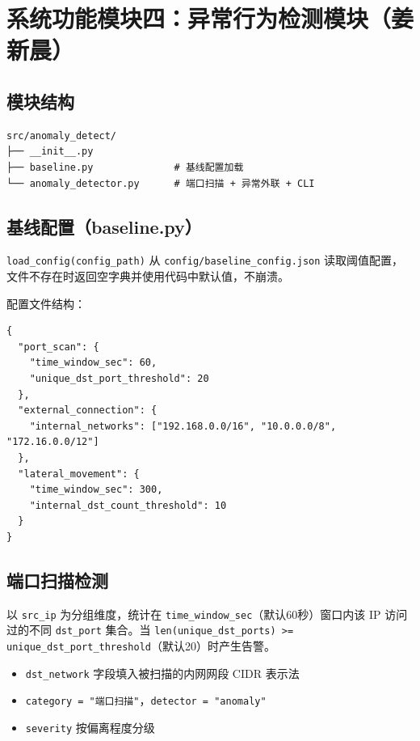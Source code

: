 \documentclass[12pt,a4paper]{ctexart}
\begin{document}
\section{系统功能模块四：异常行为检测模块（姜新晨）}

\subsection{模块结构}

\begin{verbatim}
src/anomaly_detect/
├── __init__.py
├── baseline.py              # 基线配置加载
└── anomaly_detector.py      # 端口扫描 + 异常外联 + CLI
\end{verbatim}

\subsection{基线配置（baseline.py）}

\texttt{load\_config(config\_path)} 从 \texttt{config/baseline\_config.json} 读取阈值配置，文件不存在时返回空字典并使用代码中默认值，不崩溃。

配置文件结构：
\begin{lstlisting}
{
  "port_scan": {
    "time_window_sec": 60,
    "unique_dst_port_threshold": 20
  },
  "external_connection": {
    "internal_networks": ["192.168.0.0/16", "10.0.0.0/8", "172.16.0.0/12"]
  },
  "lateral_movement": {
    "time_window_sec": 300,
    "internal_dst_count_threshold": 10
  }
}
\end{lstlisting}

\subsection{端口扫描检测}

以 \texttt{src\_ip} 为分组维度，统计在 \texttt{time\_window\_sec}（默认60秒）窗口内该 IP 访问过的不同 \texttt{dst\_port} 集合。当 \texttt{len(unique\_dst\_ports) >= unique\_dst\_port\_threshold}（默认20）时产生告警。

\begin{itemize}[nosep]
    \item \texttt{dst\_network} 字段填入被扫描的内网网段 CIDR 表示法
    \item \texttt{category = "端口扫描"}，\texttt{detector = "anomaly"}
    \item \texttt{severity} 按偏离程度分级
\end{itemize}
\end{document}
